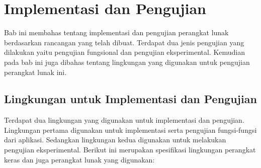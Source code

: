 \chapter{Implementasi dan Pengujian}
\label{chapter:implementasiPengujian}
Bab ini membahas tentang implementasi dan pengujian perangkat lunak berdasarkan rancangan yang telah dibuat. Terdapat dua jenis pengujian yang dilakukan yaitu pengujian fungsional dan pengujian eksperimental. Kemudian pada bab ini juga dibahas tentang lingkungan yang digunakan untuk pengujian perangkat lunak ini.

\section{Lingkungan untuk Implementasi dan Pengujian}
Terdapat dua lingkungan yang digunakan untuk implementasi dan pengujian. Lingkungan pertama digunakan untuk implementasi serta pengujian fungsi-fungsi dari aplikasi. Sedangkan lingkungan kedua digunakan untuk melakukan pengujian eksperimental. Berikut ini merupakan spesifikasi lingkungan perangkat keras dan juga perangkat lunak yang digunakan:
